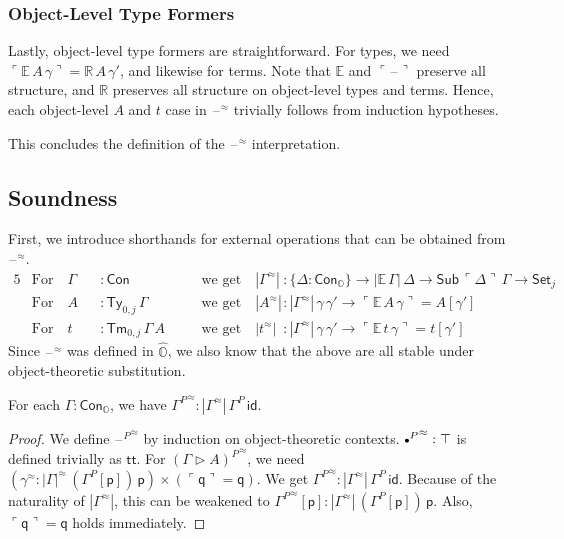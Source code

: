 \documentclass[acmsmall,screen]{acmart}
\newcommand{\msf}[1]{\mathsf{#1}}
\newcommand{\mbb}[1]{\mathbb{#1}}
\newcommand{\ext}{\triangleright}
\newcommand{\mbbo}{\mbb{O}}
\newcommand{\Con}{\msf{Con}}
\newcommand{\Sub}{\msf{Sub}}
\newcommand{\Ty}{\msf{Ty}}
\newcommand{\Tm}{\msf{Tm}}
\newcommand{\Cono}{\msf{Con}_{\mbbo}}
\newcommand{\p}{\mathsf{p}}
\newcommand{\q}{\mathsf{q}}
\renewcommand{\tt}{\msf{tt}}
\newcommand{\emptycon}{\scaleobj{.75}\bullet}
\newcommand{\id}{\msf{id}}
\newcommand{\Set}{\mathsf{Set}}
\newcommand{\blank}{{\mathord{\hspace{1pt}\text{--}\hspace{1pt}}}}
\newcommand{\emb}[1]{\ulcorner#1\urcorner}
\newcommand{\hato}{\bm\hat{\mbbo}}
\newcommand{\ev}{\mbb{E}}
\newcommand{\re}{\mbb{R}}
\theoremstyle{remark}
\newcommand{\rel}{^{\approx}}
\begin{document}
\subsubsection{Object-Level Type Formers}
Lastly, object-level type formers are straightforward. For types, we need
$\emb{\ev\,A\,\gamma} = \re\,A\,\gamma'$, and likewise for terms. Note that
$\ev$ and $\emb{\blank}$ preserve all structure, and $\re$ preserves all
structure on object-level types and terms. Hence, each object-level $A$ and $t$
case in $\blank\rel$ trivially follows from induction hypotheses.

This concludes the definition of the $\blank\rel$ interpretation.

\subsection{Soundness}

\begin{definition} First, we introduce shorthands for
external operations that can be obtained from $\blank\rel$.
\begin{alignat*}{5}
  & \text{For}\hspace{1em} \Gamma &&: \Con \hspace{1em}&&\text{we get}\hspace{1em}
         |\Gamma\rel| &&: \{\Delta : \Cono\} \to |\ev\,\Gamma|\,\Delta \to \Sub\,\emb{\Delta}\,\Gamma \to \Set_j\\
  & \text{For}\hspace{1em} A &&: \Ty_{0,j}\,\Gamma \hspace{1em}&&\text{we get}\hspace{1em} |A\rel| &&: |\Gamma\rel|\,\gamma\,\gamma' \to \emb{\ev\,A\,\gamma} = A[\gamma']\\
  & \text{For}\hspace{1em} t &&: \Tm_{0,j}\,\Gamma\,A \hspace{1em}&&\text{we get}\hspace{1em}|t\rel| &&: |\Gamma\rel|\,\gamma\,\gamma' \to \emb{\ev\,t\,\gamma} = t[\gamma']
\end{alignat*}
Since $\blank\rel$ was defined in $\hato$, we also know that the above are all
stable under object-theoretic substitution.
\end{definition}

\begin{theorem}
For each $\Gamma : \Cono$, we have ${\Gamma^P}\rel : |\Gamma\rel|\,\Gamma^P\,\id$.
\end{theorem}
\begin{proof}
We define ${\blank^P}\rel$ by induction on object-theoretic contexts.
${\emptycon^P}\rel : \top$ is defined trivially as $\tt$. For ${(\Gamma \ext
  A)^P}\rel$, we need $(\gamma\rel : |\Gamma|\rel\,(\Gamma^P[\p])\,\p) \times
(\emb{\q} = \q)$. We get ${\Gamma^P}\rel : |\Gamma\rel|\,\Gamma^P\,\id$. Because
of the naturality of $|\Gamma\rel|$, this can be weakened to ${\Gamma^P}\rel[\p]
: |\Gamma\rel|\,(\Gamma^P[\p])\,\p$. Also, $\emb{\q} = \q$ holds immediately.
\end{proof}
\end{document}
